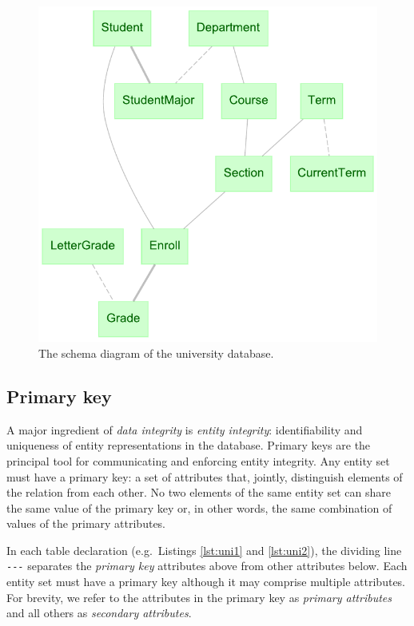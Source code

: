 \documentclass[letter,10pt]{article}
\begin{document}
\begin{figure}
\includegraphics[width=\columnwidth]{uni_erd.pdf}
\caption{The schema diagram of the university database.}
\label{fig:erd}
\end{figure}


\subsection{Primary key}
A major ingredient of \emph{data integrity} is \emph{entity integrity}: identifiability and uniqueness of entity representations in the database. 
{Primary keys} are the principal tool for communicating and enforcing entity integrity. 
Any entity set must have a primary key: a set of attributes that, jointly, distinguish elements of the relation from each other.
No two elements of the same entity set can share the same value of the primary key or, in other words, the same combination of values of the primary attributes.

In each table declaration (e.g.\ Listings \ref{lst:uni1} and \ref{lst:uni2}), the dividing line \lstinline$---$ separates the \emph{primary key} attributes above from other attributes below.  
Each entity set must have a primary key although it may comprise multiple attributes. 
For brevity, we refer to the attributes in the primary key as \emph{primary attributes} and all others as \emph{secondary attributes}.
\end{document}
